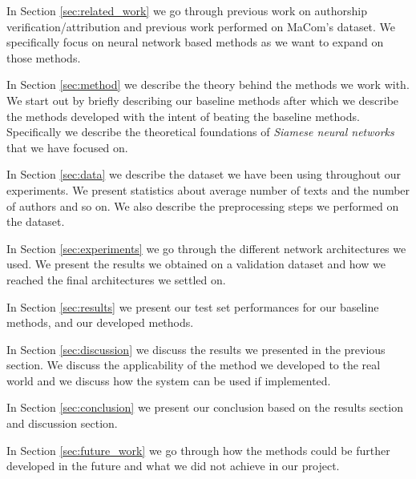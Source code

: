 In Section \ref{sec:related_work} we go through previous work on authorship
verification/attribution and previous work performed on MaCom's dataset. We
specifically focus on neural network based methods as we want to expand on those
methods.

In Section \ref{sec:method} we describe the theory behind the methods we work
with. We start out by briefly describing our baseline methods after which
we describe the methods developed with the intent of beating the baseline
methods. Specifically we describe the theoretical foundations of \textit{Siamese
neural networks} that we have focused on.

In Section \ref{sec:data} we describe the dataset we have been using throughout
our experiments. We present statistics about average number of texts and the
number of authors and so on. We also describe the preprocessing steps we
performed on the dataset.

In Section \ref{sec:experiments} we go through the different network
architectures we used. We present the results we obtained on a validation
dataset and how we reached the final architectures we settled on.

In Section \ref{sec:results} we present our test set performances for our
baseline methods, and our developed methods.

In Section \ref{sec:discussion} we discuss the results we presented in the
previous section. We discuss the applicability of the method we developed to the
real world and we discuss how the system can be used if implemented.

In Section \ref{sec:conclusion} we present our conclusion based on the results
section and discussion section.

In Section \ref{sec:future_work} we go through how the methods could be further
developed in the future and what we did not achieve in our project.
